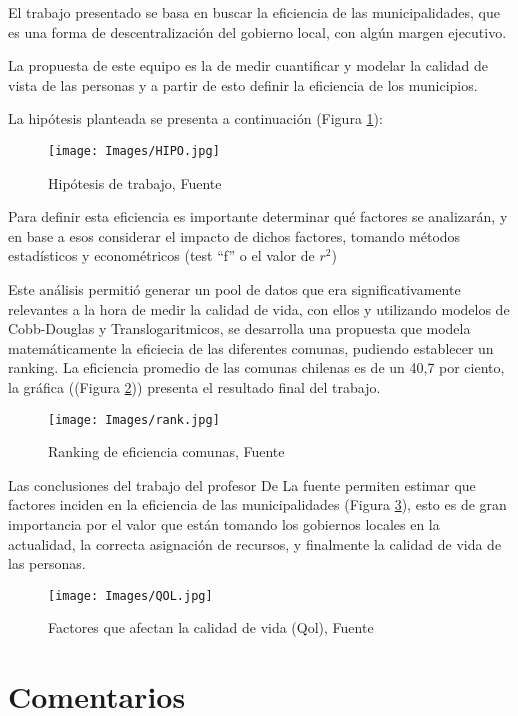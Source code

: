 \documentclass{article}
\begin{document}
El trabajo presentado se basa en buscar la eficiencia de las municipalidades, que es una forma de descentralización del gobierno local, con algún margen ejecutivo.

La propuesta de este equipo es la de medir cuantificar y modelar la calidad de vista de las personas y a partir de esto definir la eficiencia de los municipios.

La hipótesis planteada se presenta a continuación (Figura \ref{hip}):

\begin{figure}[H]
\texttt{[image: Images/HIPO.jpg]}
\centering
\caption{Hipótesis de trabajo, Fuente \cite{article1}}
\label{hip}
\end{figure}


Para definir esta eficiencia es importante determinar qué factores se analizarán, y en base a esos considerar el impacto de dichos factores, tomando métodos estadísticos y econométricos (test “f” o el valor de $r^{2}$)

Este análisis permitió generar un pool de datos que era significativamente relevantes a la hora de medir la calidad de vida, con ellos y utilizando modelos de Cobb-Douglas y Translogaritmicos, se desarrolla una propuesta que modela matemáticamente la eficiecia de las diferentes comunas, pudiendo establecer un ranking. La eficiencia promedio de las comunas chilenas es de un 40,7 por ciento, la gráfica ((Figura \ref{ran})) presenta el resultado final del trabajo.

\begin{figure}[H]
\texttt{[image: Images/rank.jpg]}
\centering
\caption{Ranking de eficiencia comunas, Fuente \cite{article1}}
\label{ran}
\end{figure}


Las conclusiones del trabajo del profesor De La fuente permiten estimar que factores inciden en la eficiencia de las municipalidades (Figura \ref{q}), esto es de gran importancia por el valor que están tomando los gobiernos locales en la actualidad, la correcta asignación de recursos, y finalmente la calidad de vida de las personas.

\begin{figure}[H]
\texttt{[image: Images/QOL.jpg]}
\centering
\caption{Factores que afectan la calidad de vida (Qol), Fuente \cite{article1}}
\label{q}
\end{figure}

\section{Comentarios}
\end{document}
